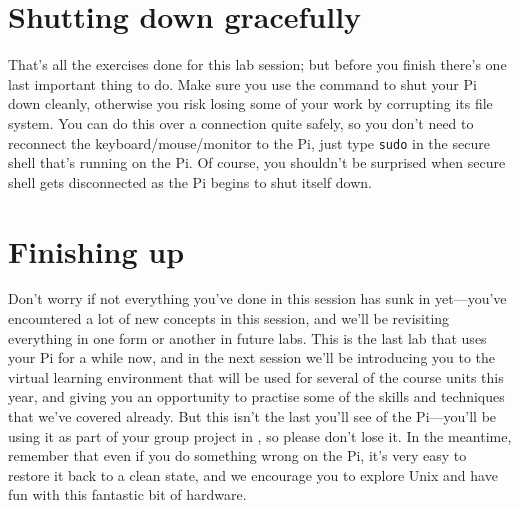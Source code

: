 \section{Shutting down gracefully}

That's all the exercises done for this lab session; but before you
finish there's one last important thing to do. Make sure you use the
 command to shut your Pi down cleanly, otherwise you
risk losing some of your work by corrupting its file system. You can
do this over a  connection quite safely, so you don't
need to reconnect the keyboard/mouse/monitor to the Pi, just type
\texttt{sudo}  in the secure shell that's running on
the Pi. Of course, you shouldn't be surprised when secure shell gets
disconnected as the Pi begins to shut itself down.

\section{Finishing up}

Don't worry if not everything you've done in this session has sunk in
yet---you've encountered a lot of new concepts in this session, and
we'll be revisiting everything in one form or another in future
labs. This is the last lab that uses your Pi for a while now, and in
the next session we'll be introducing you to the virtual learning
environment that will be used for several of the course units this
year, and giving you an opportunity to practise some of the skills and
techniques that we've covered already. But this isn't the last you'll
see of the Pi---you'll be using it as part of your group project in
, so please don't lose it. In the meantime,
remember that even if you do something wrong on the Pi, it's very easy
to restore it back to a clean state, and we encourage you to explore
Unix and have fun with this fantastic bit of hardware.
